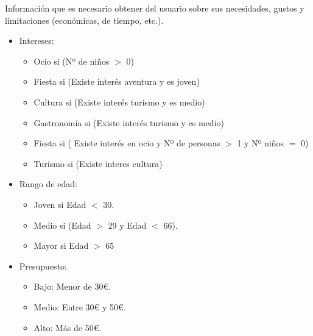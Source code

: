 \documentclass[11pt, a4paper, spanish, openright, twoside]{book}
\begin{document}
\begin{section}{Información que es necesario obtener del usuario sobre sus necesidades, gustos y limitaciones (económicas, de tiempo, etc.).}
				\begin{itemize}
					\item Intereses:
						\begin{itemize}
							\item Ocio si (Nº de niños $>$ 0)
							\item Fiesta si (Existe interés aventura y es joven)
							\item Cultura si (Existe interés turismo y es medio)
							\item Gastronomía si (Existe interés turismo y es medio)
							\item Fiesta si ( Existe interés en ocio y Nº de personas $>$ 1 y Nº niños $=$ 0)
							\item Turismo si (Existe interes cultura)
						\end{itemize}
					\item Rango de edad: 
						\begin{itemize}
							\item Joven si Edad $<$ 30.
							\item Medio si (Edad $>$ 29 y Edad $<$ 66).
							\item Mayor si Edad $>$ 65 
						\end{itemize}
					\item Presupuesto:
						\begin{itemize}
							\item Bajo: Menor de 30€.
							\item Medio: Entre 30€ y 50€.
							\item Alto: Más de 50€.
						\end{itemize}
						
				\end{itemize}
			
	\end{section}
		\newpage
\end{document}
